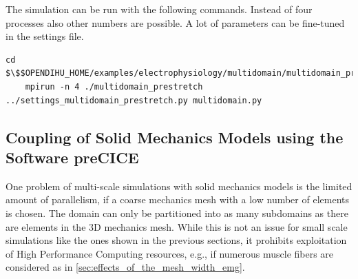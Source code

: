 




\begin{reproduce_no_break}
  The simulation can be run with the following commands. Instead of four processes also other numbers are possible. A lot of parameters can be fine-tuned in the  settings file.
  \begin{lstlisting}[columns=fullflexible,breaklines=true,postbreak=\mbox{\textcolor{gray}{$\hookrightarrow$}\space}]
    cd $\$$OPENDIHU_HOME/examples/electrophysiology/multidomain/multidomain_prestretch/build_release
    mpirun -n 4 ./multidomain_prestretch ../settings_multidomain_prestretch.py multidomain.py
  \end{lstlisting}
\end{reproduce_no_break}

%

%
\subsection{Coupling of Solid Mechanics Models using the Software preCICE}\label{sec:volume_coupling_contraction}

One problem of multi-scale simulations with solid mechanics models is the limited amount of parallelism, 
if a coarse mechanics mesh with a low number of elements is chosen. The domain can only be partitioned into as many subdomains as there are elements in the 3D mechanics mesh. While this is not an issue for small scale simulations like the ones shown in the previous sections, it prohibits exploitation of High Performance Computing resources, e.g., if numerous muscle fibers are considered as in \cref{sec:effects_of_the_mesh_width_emg}.


